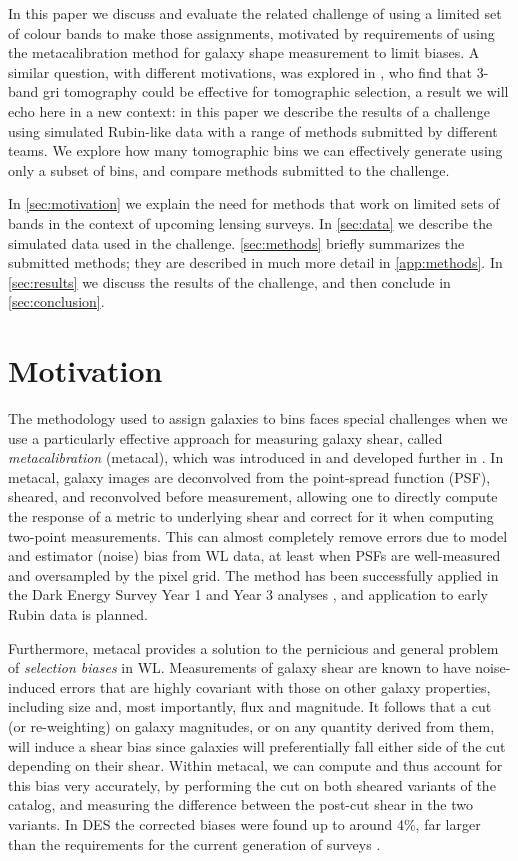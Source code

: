 \documentclass[twocolumn,twocolappendix]{aastex63}
\begin{document}
In this paper we discuss and evaluate the related challenge
of using a limited set of colour bands to make those assignments, motivated by requirements of using the
metacalibration method for galaxy shape measurement to limit biases.  
A similar question, with different motivations, was explored in \citet{jain}, who find that 3-band 
gri tomography could be effective for tomographic selection, a result we will echo here in a new context: in this paper we describe the results of a 
challenge using simulated Rubin-like data with a range of methods submitted by different teams.  We explore how many tomographic bins we can effectively generate using only a subset of bins, and compare methods submitted to the challenge.

In \autoref{sec:motivation} we explain the need for methods that work on limited sets of bands in the context of upcoming lensing surveys. In \autoref{sec:data} we describe the simulated data used in the challenge.
\autoref{sec:methods} briefly summarizes the submitted methods; they are described in much more detail in \autoref{app:methods}.  In \autoref{sec:results} we discuss the
results of the challenge, and then conclude in \autoref{sec:conclusion}.

\section{Motivation}
\label{sec:motivation}

The methodology used to assign galaxies to bins faces special challenges when we use a particularly
effective approach for measuring galaxy shear, called \emph{metacalibration} (metacal),
which was introduced in \citet{sheldonhuff} and developed further in \citet{sheldon}.
In metacal, galaxy images are deconvolved from the point-spread function (PSF), sheared, and
reconvolved before measurement, allowing one to directly compute the response of a metric
to underlying shear and correct for it when computing two-point measurements.  This can
almost completely remove errors due to model and estimator (noise) bias from WL data, at least
when PSFs are well-measured and oversampled by the pixel grid.  The method has been successfully
applied in the Dark Energy Survey Year 1 and Year 3 analyses \citep{des-y1-cat, des-y3-cat},
and application to early Rubin data is planned.

Furthermore, metacal provides a solution to the pernicious and general problem of
\emph{selection biases} in WL.  Measurements of galaxy shear are known to have noise-induced errors
that are
highly covariant with those on other galaxy properties, including size and, most importantly, flux and
magnitude.  It follows that a cut (or re-weighting) on galaxy magnitudes, or on any quantity derived
from  them, will induce a shear bias since galaxies will preferentially fall either side of the cut
depending on their shear.  Within metacal, we can compute and thus account for this bias
very accurately, by performing the cut on both
sheared variants of the catalog, and measuring the difference between the post-cut shear in the two
variants.  In DES the corrected biases were found up to around 4\%, far larger than
the requirements for the current generation of surveys \citep{des-y1-cat}.
\end{document}
